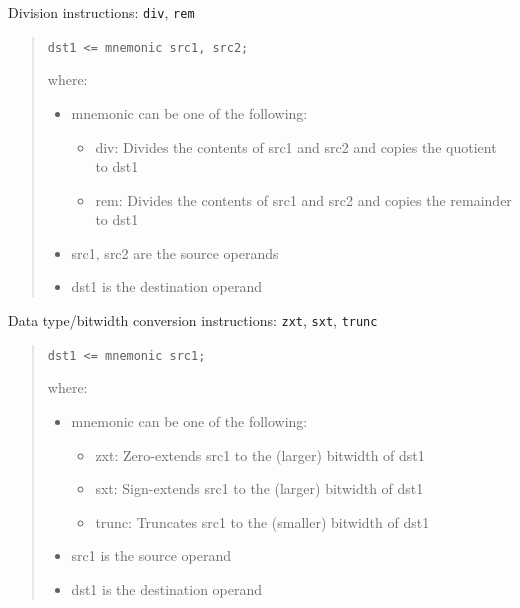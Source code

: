 \documentclass[a4paper]{article}
\begin{document}
Division instructions: \texttt{div}, \texttt{rem}
%
\begin{quote}

\texttt{dst1 <= mnemonic src1, src2;}

where:
%
\begin{itemize}

\item mnemonic can be one of the following:
%
\begin{itemize}

\item div: Divides the contents of src1 and src2 and copies the quotient to
dst1

\item rem: Divides the contents of src1 and src2 and copies the remainder to
dst1

\end{itemize}

\item src1, src2 are the source operands

\item dst1 is the destination operand

\end{itemize}

\end{quote}

Data type/bitwidth conversion instructions: \texttt{zxt}, \texttt{sxt}, \texttt{trunc}
%
\begin{quote}

\texttt{dst1 <= mnemonic src1;}

where:
%
\begin{itemize}

\item mnemonic can be one of the following:
%
\begin{itemize}

\item zxt: Zero-extends src1 to the (larger) bitwidth of dst1

\item sxt: Sign-extends src1 to the (larger) bitwidth of dst1

\item trunc: Truncates src1 to the (smaller) bitwidth of dst1

\end{itemize}

\item src1 is the source operand

\item dst1 is the destination operand

\end{itemize}

\end{quote}
\end{document}
